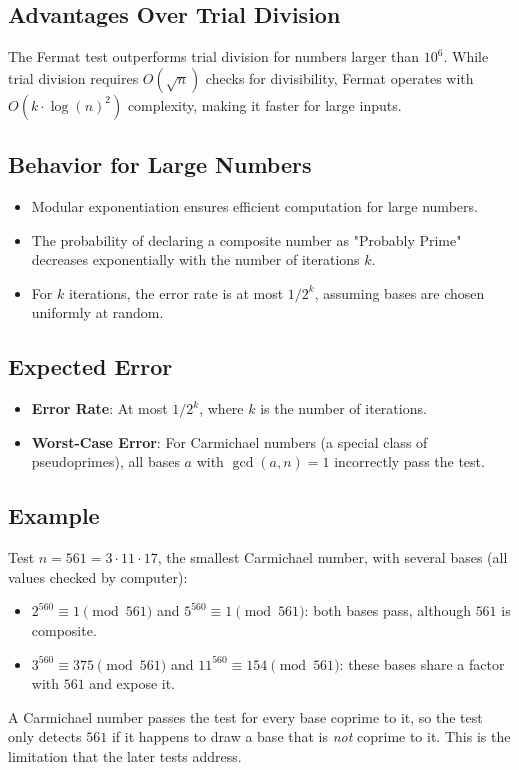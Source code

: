 \documentclass[12pt]{article}
\begin{document}
\subsection*{Advantages Over Trial Division}

The Fermat test outperforms trial division for numbers larger than \( 10^6 \). While trial division requires \( O(\sqrt{n}) \) checks for divisibility, Fermat operates with \( O(k \cdot \log(n)^2) \) complexity, making it faster for large inputs.

\subsection*{Behavior for Large Numbers}

\begin{itemize}
    \item Modular exponentiation ensures efficient computation for large numbers.
    \item The probability of declaring a composite number as "Probably Prime" decreases exponentially with the number of iterations \( k \).
    \item For \( k \) iterations, the error rate is at most \( 1 / 2^k \), assuming bases are chosen uniformly at random.
\end{itemize}

\subsection*{Expected Error}

\begin{itemize}
    \item \textbf{Error Rate}: At most \( 1 / 2^k \), where \( k \) is the number of iterations.
    \item \textbf{Worst-Case Error}: For Carmichael numbers (a special class of pseudoprimes), all bases \( a \) with \( \gcd(a, n) = 1 \) incorrectly pass the test.
\end{itemize}

\subsection*{Example}

Test \( n = 561 = 3 \cdot 11 \cdot 17 \), the smallest Carmichael number, with several bases (all values checked by computer):
\begin{itemize}
    \item \( 2^{560} \equiv 1 \pmod{561} \) and \( 5^{560} \equiv 1 \pmod{561} \): both bases pass, although \( 561 \) is composite.
    \item \( 3^{560} \equiv 375 \pmod{561} \) and \( 11^{560} \equiv 154 \pmod{561} \): these bases share a factor with \( 561 \) and expose it.
\end{itemize}
A Carmichael number passes the test for every base coprime to it, so the test only detects \( 561 \) if it happens to draw a base that is \emph{not} coprime to it. This is the limitation that the later tests address.
\end{document}
